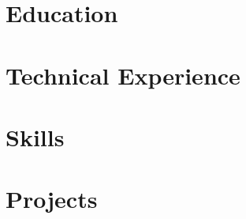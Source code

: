 \documentclass[letter,10pt]{article}
\begin{document}


\section{Education}


\section{Technical Experience}


\section{Skills}



\section{Projects}


% 
\end{document}
